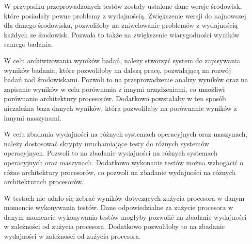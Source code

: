 W przypadku przeprowadzonych testów zostały ustalone dane wersje środowisk, które posiadały pewne problemy z wydajnością. Zwiększenie wersji do najnowszej dla danego środowiska, pozwoliłoby na zniwelowanie problemów z wydajnością każdych ze środowisk. Pozwala to także na zwiększenie wiarygodności wyników samego badania.

W celu archiwizowania wyników badań, należy stworzyć system do zapisywania wyników badania, które pozwoliłoby na dalszą pracę, pozwalającą na rozwój badań nad środowiskami. Pozwoli to na przeprowadzenie analizy wyników oraz na zapisanie wyników w celu porównania z innymi urządzeniami, co umożliwi porównanie architektury procesorów. Dodatkowo powstałaby w ten sposób niezależna baza danych wyników, która pozwoliłaby na porównanie wyników z innymi maszynami.

W celu zbadania wydajności na różnych systemach operacyjnych oraz maszynach, należy dostosować skrypty uruchamiające testy do różnych systemów operacyjnych. Pozwoli to na zbadanie wydajności na różnych systemach operacyjnych oraz maszynach. Dodatkowo wykonanie testów można wzbogacić o różne architektury procesorów, co pozwoli na zbadanie wydajności na różnych architekturach procesorów.

W testach nie udało się zebrać wyników dotyczących zużycia procesora w danym momencie wykonywania testów. Dane odpowiedzialne za zużycie procesora w danym momencie wykonywania testów mogłyby pozwolić na zbadanie wydajności w zależności od zużycia procesora. Dodatkowo pozwoliłoby to na zbadanie wydajności w zależności od zużycia procesora.
